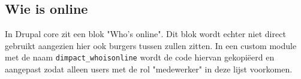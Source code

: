 \subsection{Wie is online}\label{wieisonline}

In Drupal core zit een blok "Who's online". Dit blok wordt echter niet direct gebruikt aangezien hier ook burgers tussen zullen zitten. In een custom module met de naam \texttt{dimpact\_whoisonline} wordt de code hiervan gekopi\"{e}erd en aangepast zodat alleen users met de rol "medewerker" in deze lijst voorkomen.
